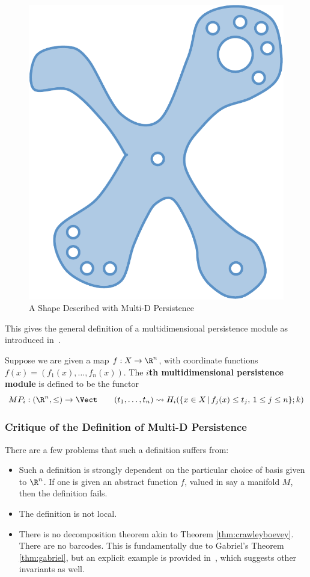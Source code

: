 \begin{figure}[ht]
\begin{center}
\includegraphics[width=.7\textwidth]{flare_holes.pdf}
\end{center}
\caption{A Shape Described with Multi-D Persistence}
\label{fig:flare_holes}
\end{figure}

This gives the general definition of a multidimensional persistence module as introduced in~\cite{carlsson2009theory}.

\begin{defn}
Suppose we are given a map $f:X\to\R^n$, with coordinate functions $f(x)=(f_1(x),\ldots,f_n(x))$. The \textbf{$i$th multidimensional persistence module} is defined to be the functor
\[
MP_i:(\R^n,\leq) \to \Vect \qquad (t_1,\ldots,t_n)\rightsquigarrow H_i(\{x\in X\,|\,f_j(x)\leq t_j,\, 1\leq j\leq n\};k)
\]
\end{defn}

\subsubsection{Critique of the Definition of Multi-D Persistence}

There are a few problems that such a definition suffers from:
\begin{itemize}
\item Such a definition is strongly dependent on the particular choice of basis given to $\R^n$. If one is given an abstract function $f$, valued in say a manifold $M$, then the definition fails.
\item The definition is not local.
\item There is no decomposition theorem akin to Theorem \ref{thm:crawleyboevey}. There are no barcodes. This is fundamentally due to Gabriel's Theorem \ref{thm:gabriel}, but an explicit example is provided in~\cite[Sec.5.2]{carlsson2009theory}, which suggests other invariants as well.
\end{itemize}

